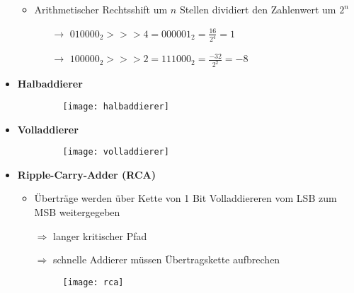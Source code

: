 \begin{itemize}
\begin{itemize}
	\item Arithmetischer Rechtsshift um $n$ Stellen dividiert den Zahlenwert um $2^n$
		\begin{itemize}
		\item[$\rightarrow$] $010000_2 >>> 4 = 000001_2 = \frac{16}{2^4} = 1$
		\item[$\rightarrow$] $100000_2 >>> 2 = 111000_2 = \frac{-32}{2^2} = -8$
		\end{itemize}
		
	\end{itemize}

\item \textbf{Halbaddierer}
	\begin{itemize}
	\item[]
		\begin{figure}[H]
			\begin{center}
			\texttt{[image: halbaddierer]}
			\end{center}
		\end{figure}
	\end{itemize}
	
\item \textbf{Volladdierer}
	\begin{itemize}
	\item[]
		\begin{figure}[H]
			\begin{center}
			\texttt{[image: volladdierer]}
			\end{center}
		\end{figure}
	\end{itemize}

\item \textbf{Ripple-Carry-Adder (RCA)}
	\begin{itemize}
	\item Überträge werden über Kette von 1 Bit Volladdiereren vom LSB zum MSB weitergegeben
	\item[$\Rightarrow$] langer kritischer Pfad
	\item[$\Rightarrow$] schnelle Addierer müssen Übertragskette aufbrechen
	\item[]
		\begin{figure}[H]
			\begin{center}
			\texttt{[image: rca]}
			\end{center}
		\end{figure}
	\end{itemize}


\end{itemize}
